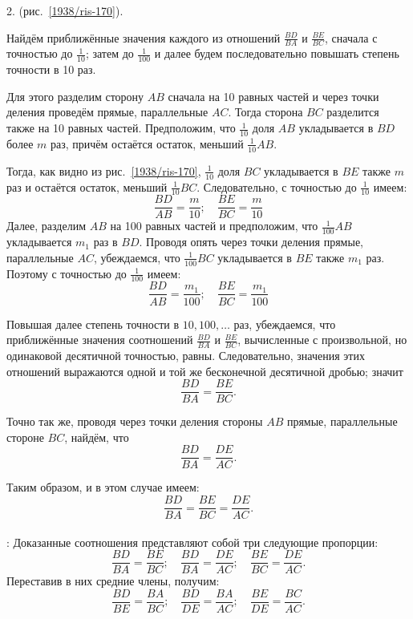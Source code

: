 \documentclass[oneside]{book}
\begin{document}
2.  (рис.~\ref{1938/ris-170}).

Найдём приближённые значения каждого из отношений $\frac{BD}{BA}$ и $\frac{BE}{BC}$, сначала с точностью до $\tfrac1{10}$;
затем до $\tfrac1{100}$ и далее будем последовательно повышать степень точности в 10 раз.

Для этого разделим сторону $AB$ сначала на 10 равных частей и через точки деления проведём прямые, параллельные $AC$.
Тогда сторона $BC$ разделится также на 10 равных частей.
Предположим, что $\tfrac1{10}$ доля $AB$ укладывается в $BD$ более $m$
раз, причём остаётся остаток, меньший $\tfrac1{10}AB$.

Тогда, как видно из рис.~\ref{1938/ris-170}, $\tfrac1{10}$ доля $BC$ укладывается в $BE$ также $m$ раз и остаётся остаток, меньший $\tfrac1{10}BC$.
Следовательно, с точностью до $\tfrac1{10}$ имеем:
\[\frac{BD}{AB}=\frac{m}{10}; 
\quad
\frac{BE}{BC}=\frac{m}{10}\]
Далее, разделим $AB$ на 100 равных частей и предположим, что $\tfrac1{100}AB$ укладывается $m_1$ раз в $BD$.
Проводя опять через точки деления прямые, параллельные $AC$, убеждаемся, что $\tfrac1{100}BC$ укладывается в $BE$ также $m_1$ раз.
Поэтому с точностью до $\tfrac1{100}$ имеем:
\[\frac{BD}{AB}=\frac{m_1}{100}; 
\quad
\frac{BE}{BC}=\frac{m_1}{100}\]

Повышая далее степень точности в $10,100,\dots$ раз, убеждаемся, что приближённые значения соотношений $\frac{BD}{BA}$ и $\frac{BE}{BC}$, вычисленные с произвольной, но одинаковой десятичной точностью, равны.
Следовательно, значения этих отношений выражаются одной и той же бесконечной десятичной дробью;
значит
\[\frac{BD}{BA}=\frac{BE}{BC}.\]

Точно так же, проводя через точки деления стороны $AB$ прямые, параллельные стороне $BC$, найдём, что
\[\frac{BD}{BA}=\frac{DE}{AC}.\]

Таким образом, и в этом случае имеем:
\[\frac{BD}{BA}=\frac{BE}{BC}=\frac{DE}{AC}.\]


\paragraph{}\label{1938/160}
:
Доказанные соотношения представляют собой три следующие пропорции:
\[\frac{BD}{BA}=\frac{BE}{BC};
\quad
\frac{BD}{BA}=\frac{DE}{AC};
\quad
\frac{BE}{BC}=\frac{DE}{AC}.\]
Переставив в них средние члены, получим:
\[\frac{BD}{BE}=\frac{BA}{BC};
\quad
\frac{BD}{DE}=\frac{BA}{AC};
\quad
\frac{BE}{DE}=\frac{BC}{AC}.\]
\end{document}
